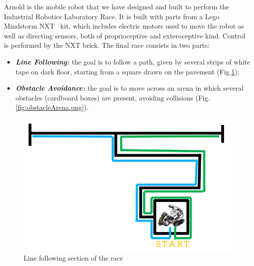 \documentclass[a4paper,11pt,oneside]{book}
\begin{document}
			Arnold is the mobile robot that we have designed and built to perform the Industrial Robotics Laboratory Race. It is built with parts from a Lego Mindstorm NXT\textregistered ~ kit, which includes electric motors used to move the robot as well as directing sensors, both of proprioceptive and exteroceptive kind. Control is performed by the NXT brick. The final race consists in two parts:
			\begin{itemize}                          
				\item \textit{\textbf {Line Following:}} the goal is to follow a path, given by several strips of white tape on dark floor, starting from a square drawn on the pavement (Fig.\ref{fig:lineFollowingArena.png});
				
				\item \textit{\textbf {Obstacle Avoidance:}} the goal is to move across an arena in which several obstacles (cardboard boxes) are present, avoiding collisions (Fig.\ref{fig:obstacleArena.png}).
			
			\end{itemize}
		
		\begin{figure}
			\centering
			\includegraphics[scale=0.55]{figs/lineFollowingArena}
			\caption{Line following section of the race}\label{fig:lineFollowingArena.png}
		\end{figure}
		
\end{document}
